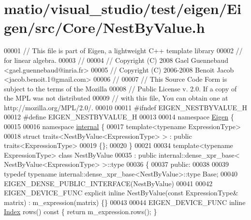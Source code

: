\hypertarget{matio_2visual__studio_2test_2eigen_2_eigen_2src_2_core_2_nest_by_value_8h_source}{}\section{matio/visual\+\_\+studio/test/eigen/\+Eigen/src/\+Core/\+Nest\+By\+Value.h}
\label{matio_2visual__studio_2test_2eigen_2_eigen_2src_2_core_2_nest_by_value_8h_source}

\begin{DoxyCode}
00001 \textcolor{comment}{// This file is part of Eigen, a lightweight C++ template library}
00002 \textcolor{comment}{// for linear algebra.}
00003 \textcolor{comment}{//}
00004 \textcolor{comment}{// Copyright (C) 2008 Gael Guennebaud <gael.guennebaud@inria.fr>}
00005 \textcolor{comment}{// Copyright (C) 2006-2008 Benoit Jacob <jacob.benoit.1@gmail.com>}
00006 \textcolor{comment}{//}
00007 \textcolor{comment}{// This Source Code Form is subject to the terms of the Mozilla}
00008 \textcolor{comment}{// Public License v. 2.0. If a copy of the MPL was not distributed}
00009 \textcolor{comment}{// with this file, You can obtain one at http://mozilla.org/MPL/2.0/.}
00010 
00011 \textcolor{preprocessor}{#ifndef EIGEN\_NESTBYVALUE\_H}
00012 \textcolor{preprocessor}{#define EIGEN\_NESTBYVALUE\_H}
00013 
00014 \textcolor{keyword}{namespace }\hyperlink{namespace_eigen}{Eigen} \{
00015 
00016 \textcolor{keyword}{namespace }\hyperlink{namespaceinternal}{internal} \{
00017 \textcolor{keyword}{template}<\textcolor{keyword}{typename} ExpressionType>
00018 \textcolor{keyword}{struct }traits<NestByValue<ExpressionType> > : \textcolor{keyword}{public} traits<ExpressionType>
00019 \{\};
00020 \}
00021 
00034 \textcolor{keyword}{template}<\textcolor{keyword}{typename} ExpressionType> \textcolor{keyword}{class }NestByValue
00035   : \textcolor{keyword}{public} internal::dense\_xpr\_base< NestByValue<ExpressionType> >::type
00036 \{
00037   \textcolor{keyword}{public}:
00038 
00039     \textcolor{keyword}{typedef} \textcolor{keyword}{typename} internal::dense\_xpr\_base<NestByValue>::type Base;
00040     EIGEN\_DENSE\_PUBLIC\_INTERFACE(NestByValue)
00041 
00042     EIGEN\_DEVICE\_FUNC \textcolor{keyword}{explicit} \textcolor{keyword}{inline} NestByValue(\textcolor{keyword}{const} ExpressionType& matrix) : m\_expression(matrix) \{\}
00043 
00044     EIGEN\_DEVICE\_FUNC \textcolor{keyword}{inline} \hyperlink{namespace_eigen_a62e77e0933482dafde8fe197d9a2cfde}{Index} rows()\textcolor{keyword}{ const }\{ \textcolor{keywordflow}{return} m\_expression.rows(); \}

\end{DoxyCode}
